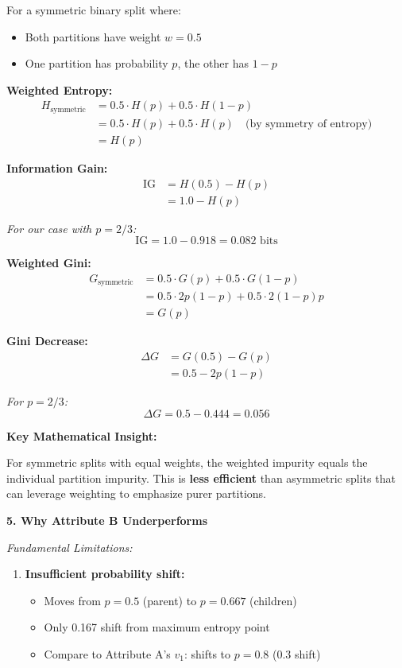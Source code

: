 \documentclass[12pt]{article}
\begin{document}
\begin{explanation}
For a symmetric binary split where:
\begin{itemize}
    \item Both partitions have weight $w = 0.5$
    \item One partition has probability $p$, the other has $1-p$
\end{itemize}

\textbf{Weighted Entropy:}
\begin{align*}
H_{\text{symmetric}} &= 0.5 \cdot H(p) + 0.5 \cdot H(1-p) \\
&= 0.5 \cdot H(p) + 0.5 \cdot H(p) \quad \text{(by symmetry of entropy)} \\
&= H(p)
\end{align*}

\textbf{Information Gain:}
\begin{align*}
\text{IG} &= H(0.5) - H(p) \\
&= 1.0 - H(p)
\end{align*}

\textit{For our case with $p = 2/3$:}
\[
\text{IG} = 1.0 - 0.918 = 0.082 \text{ bits}
\]

\textbf{Weighted Gini:}
\begin{align*}
G_{\text{symmetric}} &= 0.5 \cdot G(p) + 0.5 \cdot G(1-p) \\
&= 0.5 \cdot 2p(1-p) + 0.5 \cdot 2(1-p)p \\
&= G(p)
\end{align*}

\textbf{Gini Decrease:}
\begin{align*}
\Delta G &= G(0.5) - G(p) \\
&= 0.5 - 2p(1-p)
\end{align*}

\textit{For $p = 2/3$:}
\[
\Delta G = 0.5 - 0.444 = 0.056
\]

\textbf{Key Mathematical Insight:}

For symmetric splits with equal weights, the weighted impurity equals the individual partition impurity. This is \textbf{less efficient} than asymmetric splits that can leverage weighting to emphasize purer partitions.

\textbf{5. Why Attribute B Underperforms}

\textit{Fundamental Limitations:}

\begin{enumerate}
    \item \textbf{Insufficient probability shift:}
    \begin{itemize}
        \item Moves from $p = 0.5$ (parent) to $p = 0.667$ (children)
        \item Only 0.167 shift from maximum entropy point
        \item Compare to Attribute A's $v_1$: shifts to $p = 0.8$ (0.3 shift)
    \end{itemize}


\end{enumerate}
\end{explanation}
\end{document}
